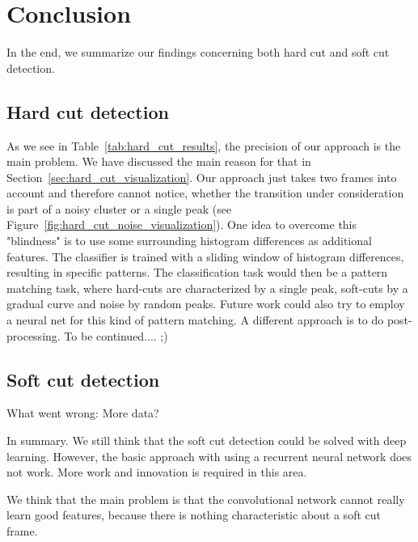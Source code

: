 \section{Conclusion}
\label{sec:conclusion}
In the end, we summarize our findings concerning both hard cut and soft cut detection.

\subsection{Hard cut detection}
\label{sec:conclusion_hard_cut}

As we see in Table~\ref{tab:hard_cut_results}, the precision of our approach is the main problem. 
We have discussed the main reason for that in Section~\ref{sec:hard_cut_visualization}.
Our approach just takes two frames into account and therefore cannot notice, whether the transition under consideration is part of a noisy cluster or a single peak (see Figure~\ref{fig:hard_cut_noise_visualization}).
One idea to overcome this "blindness" is to use some surrounding histogram differences as additional features. The classifier is trained with a sliding window of histogram differences, resulting in specific patterns. The classification task would then be a pattern matching task, where hard-cuts are characterized by a single peak, soft-cuts by a gradual curve and noise by random peaks. Future work could also try to employ a neural net for this kind of pattern matching.
A different approach is to do post-processing.
To be continued.... ;)

\subsection{Soft cut detection}
\label{sec:conclusion_hard_cut}

What went wrong:
More data?

In summary.
We still think that the soft cut detection could be solved with deep learning.
However, the basic approach with using a recurrent neural network does not work.
More work and innovation is required in this area.

We think that the main problem is that the convolutional network cannot really learn good features, because there is nothing characteristic about a soft cut frame.
